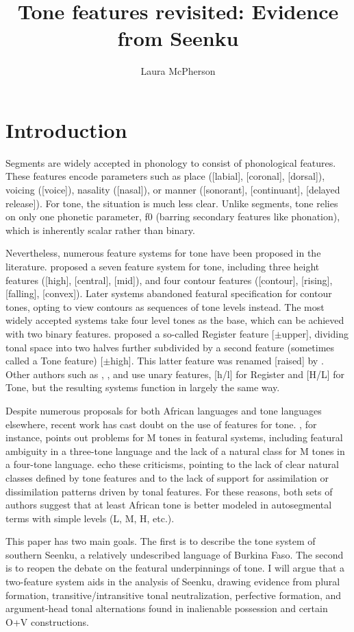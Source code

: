 \documentclass[output=paper]{langsci/langscibook}
\title{Tone features revisited: Evidence from Seenku}
\author{%
Laura McPherson \affiliation{Dartmouth College} 
}
\begin{document}
 \section{Introduction}
 
 Segments are widely accepted in phonology to consist of phonological features. These features encode parameters such as place ([labial], [coronal], [dorsal]), voicing ([voice]), nasality ([nasal]), or manner ([sonorant], [continuant], [delayed release]). For tone, the situation is much less clear. Unlike segments, tone relies on only one phonetic parameter, f0 (barring secondary features like phonation), which is inherently scalar rather than binary.
 
Nevertheless, numerous feature systems for tone have been proposed in the literature. \citet{Wang67} proposed a seven feature system for tone, including three height features ([high], [central], [mid]), and four contour features ([contour], [rising], [falling], [convex]). Later systems abandoned featural specification for contour tones, opting to view contours as sequences of tone levels instead. The most widely accepted systems take four level tones as the base, which can be achieved with two binary features. \citet{Yip80} proposed a so-called Register feature [$\pm$upper], dividing tonal space into two halves further subdivided by a second feature (sometimes called a Tone feature) [$\pm$high]. This latter feature was renamed [raised] by \citet{Pulleyblank86}. Other authors such as \citet{Clements83}, \citet{Snider90}, and \citet{Hyman93} use unary features, [h/l] for Register and [H/L] for Tone, but the resulting systems function in largely the same way.

Despite numerous proposals for both African languages and tone languages elsewhere, recent work has cast doubt on the use of features for tone. \citet{Hyman10b}, for instance, points out problems for M tones in featural systems, including featural ambiguity in a three-tone language and the lack of a natural class for M tones in a four-tone language. \citet{Clementsetal10} echo these criticisms, pointing to the lack of clear natural classes defined by tone features and to the lack of support for assimilation or dissimilation patterns driven by tonal features. For these reasons, both sets of authors suggest that at least African tone is better modeled in autosegmental terms with simple levels (L, M, H, etc.).

This paper has two main goals. The first is to describe the tone system of southern Seenku, a relatively undescribed  language of Burkina Faso. The second is to reopen the debate on the featural underpinnings of tone. I will argue that a two-feature system aids in the analysis of Seenku, drawing evidence from plural formation, transitive/intransitive tonal neutralization, perfective formation, and argument-head tonal alternations found in inalienable possession and certain O+V constructions.
\end{document}
